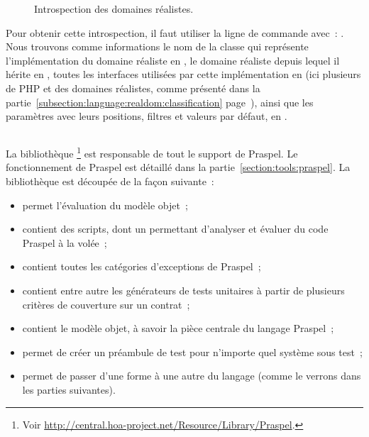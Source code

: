 \begin{example}
\begin{figure}
\caption{\label{figure:tools:reflection-realdom} Introspection des domaines
réalistes.}

\end{figure}
%
Pour obtenir cette introspection, il faut utiliser la ligne de commande avec~:
. Nous trouvons comme informations le
nom de la classe qui représente l'implémentation du domaine réaliste en
, le domaine réaliste depuis lequel il hérite en , toutes
les interfaces utilisées par cette implémentation en  (ici plusieurs
de PHP et des domaines réalistes, comme présenté dans la
partie~\ref{subsection:language:realdom:classification}
page~\pageref{subsection:language:realdom:classification}), ainsi que les
paramètres avec leurs positions, filtres et valeurs par défaut, en .

\end{example}

\subsection{}
\label{subsection:tools:hoa-praspel}

La bibliothèque \footnote{Voir
\url{http://central.hoa-project.net/Resource/Library/Praspel}.} est responsable
de tout le support de Praspel. Le fonctionnement de Praspel est détaillé dans la
partie~\ref{section:tools:praspel}. La bibliothèque est découpée de la façon
suivante~:
%
\begin{itemize}

\item {} permet l'évaluation du modèle objet~;

\item {} contient des scripts, dont un  permettant
d'analyser et évaluer du code Praspel à la volée~;

\item {} contient toutes les catégories d'exceptions de Praspel~;

\item {} contient entre autre les générateurs de tests unitaires à
partir de plusieurs critères de couverture sur un contrat~;

\item {} contient le modèle objet, à savoir la pièce centrale du
langage Praspel~;

\item {} permet de créer un préambule de test pour n'importe quel
système sous test~;

\item {} permet de passer d'une forme à une autre du langage (comme
le verrons dans les parties suivantes).

\end{itemize}


